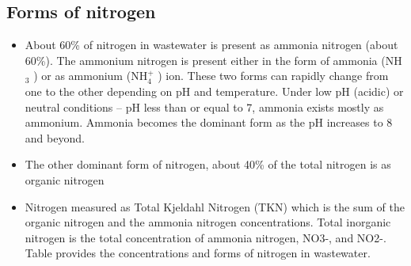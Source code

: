 	\subsection{Forms of nitrogen}	
					      \begin{itemize}
					      	\item About 60\% of nitrogen in wastewater is present as ammonia nitrogen (about 60\%).  The ammonium nitrogen is present either in the form of ammonia (NH$_3$ ) or as ammonium (NH$_4^+$ ) ion.   These two forms can rapidly change from one to the other depending on pH and temperature.  Under low pH (acidic) or neutral conditions – pH less than or equal to 7, ammonia exists mostly as ammonium.  Ammonia becomes the dominant form as the pH increases to 8 and beyond.
					      	\item The other dominant form of nitrogen, about 40\% of the total nitrogen is as organic nitrogen
					      	\item Nitrogen measured as Total Kjeldahl Nitrogen (TKN) which is the sum of the organic nitrogen and the ammonia nitrogen concentrations.  Total inorganic nitrogen is the total concentration of ammonia nitrogen, NO3-, and NO2-.   Table provides the concentrations and forms of nitrogen in wastewater.
					      \end{itemize}
					      \setlength{\arrayrulewidth}{0.7mm}
					      \setlength{\tabcolsep}{8 pt}
					      \renewcommand{\arraystretch}{0.8}
